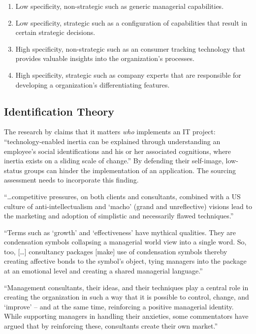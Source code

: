 \documentclass[12pt]{article}
\providecommand{\tightlist}{%
  \setlength{\itemsep}{0pt}\setlength{\parskip}{0pt}}
\begin{document}
\begin{enumerate}
\def\labelenumi{\arabic{enumi}.}
\tightlist
\item
  Low specificity, non-strategic such as generic managerial
  capabilities.
\item
  Low specificity, strategic such as a configuration of capabilities
  that result in certain strategic decisions.
\item
  High specificity, non-strategic such as an consumer tracking
  technology that provides valuable insights into the organization's
  processes.
\item
  High specificity, strategic such as company experts that are
  responsible for developing a organization's differentiating features.
\end{enumerate}

\hypertarget{identification-theory}{%
\subsection{Identification Theory}\label{identification-theory}}

The research by \citet[311-313]{schwarz2005} claims that it matters
\emph{who} implements an IT project: ``technology-enabled inertia can be
explained through understanding an employee's social identifications and
his or her associated cognitions, where inertia exists on a sliding
scale of change.'' By defending their self-image, low-status groups can
hinder the implementation of an application. The sourcing assessment
needs to incorporate this finding.

``\ldots competitive pressures, on both clients and consultants,
combined with a US culture of anti-intellectualism and `macho' (grand
and unreflective) visions lead to the marketing and adoption of
simplistic and necessarily flawed techniques.'' \citep[ 34]{sturdy1998}

``Terms such as `growth' and `effectiveness' have mythical qualities.
They are condensation symbols collapsing a managerial world view into a
single word. So, too, {[}\ldots{]} consultancy packages {[}make{]} use
of condensation symbols thereby creating affective bonds to the symbol's
object, tying managers into the package at an emotional level and
creating a shared managerial language.'' \citep[ 290]{gill1993}

``Management consultants, their ideas, and their techniques play a
central role in creating the organization in such a way that it is
possible to control, change, and `improve' -- and at the same time,
reinforcing a positive managerial identity. While supporting managers in
handling their anxieties, some commentators have argued that by
reinforcing these, consultants create their own market.'' \citep[
48]{werr2002}
\end{document}
